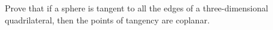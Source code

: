 Prove that if a sphere is tangent to all the edges of a three-dimensional quadrilateral,
then the points of tangency are coplanar.
